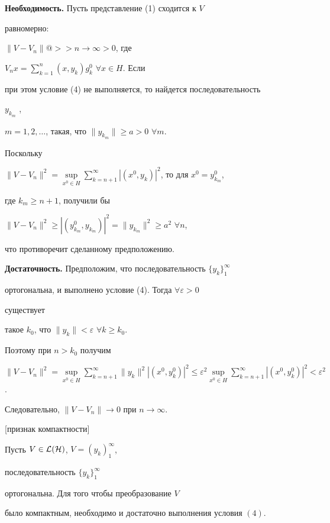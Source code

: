 \begin{pf} 


{\bf Необходимость.} Пусть представление (1) сходится к $V$


равномерно: \linebreak


$\|V-V_n\|@>>{n\to\infty}>0$, где 


$V_n x=\sum\limits^n_{k=1}(x,y_k)g^0_k$ $\forall x\in H$. Если 


при этом условие (4) не выполняется, то найдется последовательность 


$y_{k_m}$ , 


$m=1,2,\dotsc$, такая, что $\|y_{k_m}\|\ge a>0$ $\forall m$. 


Поскольку 


$\|V-V_n\|^2=\sup\limits_{x^0\in H}\sum\limits^\infty_{k=n+1} 


|(x^0,y_k)|^2$, то для $x^0=y^0_{k_m}$, 


где $k_m\ge n+1$, получили бы 


$\|V-V_n\|^2\ge|(y^0_{k_m},y_{k_m})|^2=\|y_{k_m}\|^2\ge a^2$ $\forall n$, 


что противоречит сделанному предположению. 


\smallskip 


 


{\bf Достаточность.} Предположим, что последовательность $\{y_k\}^\infty_1$ 


ортогональна, и выполнено условие (4). Тогда $\forall\varepsilon>0$ 


существует 


такое $k_0$, что $\|y_k\|<\varepsilon$ $\forall k\ge k_0$. 


Поэтому при $n>k_0$ получим 


$\|V-V_n\|^2=\sup\limits_{x^0\in H}\sum\limits^\infty_{k=n+1} 


\|y_k\|^2|(x^0,y^0_k)|^2\le\varepsilon^2\sup\limits_{x^0\in H} 


\sum\limits^\infty_{k=n+1}|(x^0,y^0_k)|^2<\varepsilon^2$. 


Следовательно, $\|V-V_n\|\to0$ при $n\to\infty$. 


\end{pf} 


 


\begin{thm}%


[{\selectfont признак компактности}] 


Пусть $V\in\cal L(H)$, $V=(y_k)^\infty_1$, 


последовательность $\{y_k\}^\infty_1$ 


ортогональна. Для того чтобы преобразование $V$ 


было компактным, необходимо и достаточно выполнения условия $(4)$. 


\end{thm} 


